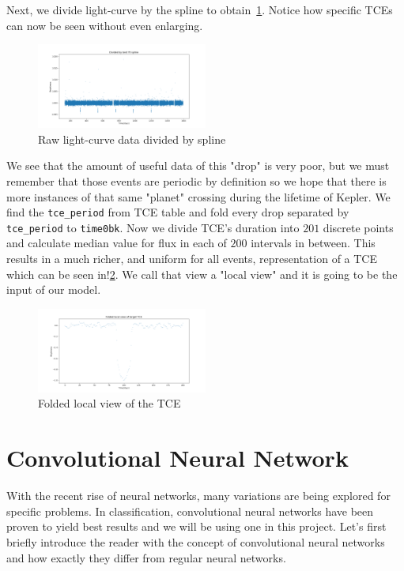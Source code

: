 \documentclass[twoside]{article}
\newcommand{\code}[1]{\texttt{#1}}
\begin{document}
\begin{multicols}{2}
Next, we divide light-curve by the spline to obtain~\ref{fig:divided_lc}. Notice how specific TCEs can now be seen without even enlarging. 
\begin{figure}[H]
\includegraphics[width=0.5\textwidth]{divsplineLC-9517393}
\caption{Raw light-curve data divided by spline}
\label{fig:divided_lc}
\end{figure}

We see that the amount of useful data of this "drop" is very poor, but we must remember that those events are periodic by definition so we hope that there is more instances of that same "planet" crossing during the lifetime of Kepler. We find the \code{tce\_period} from TCE table and fold every drop separated by \code{tce\_period} to \code{time0bk}. Now we divide TCE's duration into $201$ discrete points and calculate median value for flux in each of $200$ intervals in between. This results in a much richer, and uniform for all events, representation of a TCE which can be seen in!\ref{fig:folded_tce}. We call that view a "local view" and it is going to be the input of our model.
\begin{figure}[H]
\includegraphics[width=0.5\textwidth]{localvierLCdrop-9517393}
\caption{Folded local view of the TCE}
\label{fig:folded_tce}
\end{figure}

\section{Convolutional Neural Network}
With the recent rise of neural networks, many variations are being explored for specific problems. In classification, convolutional neural networks have been proven to yield best results and we will be using one in this project.  Let's first briefly introduce the reader with the concept of convolutional neural networks and how exactly they differ from regular neural networks.


\end{multicols}
\end{document}
